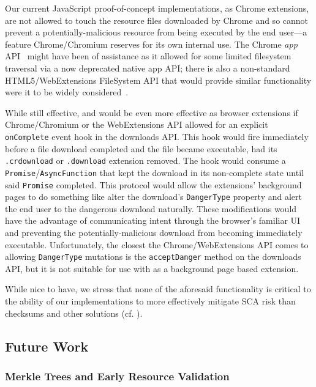 Our current JavaScript proof-of-concept implementations, as Chrome extensions,
are not allowed to touch the resource files downloaded by Chrome and so cannot
prevent a potentially-malicious resource from being executed by the end user---a
feature Chrome/Chromium reserves for its own internal use. The Chrome
\textit{app} API~\cite{AppAPI} might have been of assistance as it allowed for
some limited filesystem traversal via a now deprecated native app API; there is
also a non-standard HTML5/WebExtensions FileSystem API that would provide
similar functionality were it to be widely considered~\cite{deadSpec}.

While still effective, \DNSSYS{} and \DHTSYS{} would be even more effective as
browser extensions if Chrome/Chromium or the WebExtensions API allowed for an
explicit \texttt{onComplete} event hook in the downloads API. This hook would
fire immediately before a file download completed and the file became
executable, \ie had its \texttt{.crdownload} or \texttt{.download} extension
removed. The hook would consume a \texttt{Promise}/\texttt{AsyncFunction} that
kept the download in its non-complete state until said \texttt{Promise}
completed. This protocol would allow the extensions' background pages to do
something like alter the download's \texttt{DangerType} property and alert the
end user to the dangerous download naturally. These modifications would have the
advantage of communicating intent through the browser's familiar UI and
preventing the potentially-malicious download from becoming immediately
executable. Unfortunately, the closest the Chrome/WebExtensions API comes to
allowing \texttt{DangerType} mutations is the \texttt{acceptDanger} method on
the downloads API, but it is not suitable for use with \DNSSYS{} as a background
page based extension.

While nice to have, we stress that none of the aforesaid functionality is
critical to the ability of our implementations to more effectively mitigate SCA
risk than checksums and other solutions (cf. ).

\subsection{Future Work}

\subsubsection{Merkle Trees and Early Resource Validation}

